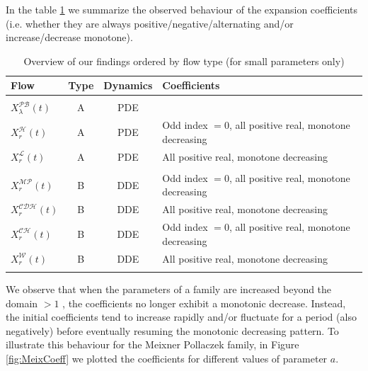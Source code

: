 \documentclass[a4paper,11pt,twoside]{amsart}
\begin{document}
In the table \ref{tab:tablefindings} we summarize the observed behaviour of the expansion coefficients (i.e. whether they are always positive/negative/alternating and/or increase/decrease monotone).
\begin{table}[H]
  \begin{center}
    \caption{Overview of our findings ordered by flow type (for small parameters only)}
    \label{tab:tablefindings}
    \begin{tabular}{|l|c|c|l|} 
      \hline
     Flow & Type & Dynamics & Coefficients\\
      \hline
      & & & \\
      $X^\mathcal{PB}_{\lambda}(t)$ & A & PDE &\\
      $X^\mathcal{H}_r(t)$  & A & PDE & Odd index $= 0$, all positive real, monotone decreasing\\
      $X^\mathcal{L}_r(t)$  & A & PDE & All positive real, monotone decreasing\\
      & & & \\
      $X^\mathcal{MP}_r(t)$  & B & DDE & Odd index $= 0$, all positive real, monotone decreasing\\
      $X^\mathcal{CDH}_r(t)$  & B & DDE & All positive real, monotone decreasing\\
      $X^\mathcal{CH}_r(t)$  & B & DDE & Odd index $= 0$, all positive real, monotone decreasing\\
      $X^\mathcal{W}_r(t)$  & B & DDE & All positive real, monotone decreasing\\
      & & & \\
      \hline
    \end{tabular}
  \end{center}
\end{table}

We observe that when the parameters of a family are increased beyond the domain  $> 1$ , the coefficients no longer exhibit a monotonic decrease. Instead, the initial coefficients tend to increase rapidly and/or fluctuate for a period (also negatively) before eventually resuming the monotonic decreasing pattern. To illustrate this behaviour for the Meixner Pollaczek family, in Figure \ref{fig:MeixCoeff} we plotted the coefficients for different values of parameter $a$.
\end{document}
